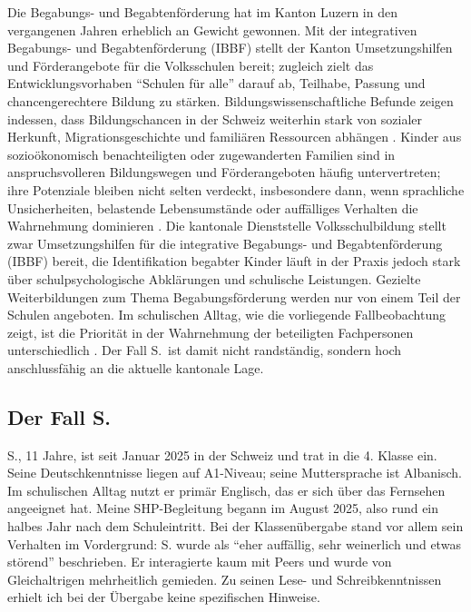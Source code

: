 \documentclass[ngerman, a4paper]{article}
\begin{document}
Die Begabungs- und Begabtenförderung hat im Kanton Luzern in den vergangenen Jahren
erheblich an Gewicht gewonnen. Mit der integrativen Begabungs- und Begabtenförderung
(IBBF) stellt der Kanton Umsetzungshilfen und Förderangebote für die Volksschulen bereit;
zugleich zielt das Entwicklungsvorhaben \enquote{Schulen für alle} darauf ab, Teilhabe, Passung
und chancengerechtere Bildung zu stärken. Bildungswissenschaftliche Befunde zeigen
indessen, dass Bildungschancen in der Schweiz weiterhin stark von sozialer Herkunft,
Migrationsgeschichte und familiären Ressourcen abhängen
\parencites[S.\,45--48]{erzinger2023pisa}[S.\,576--585]{stamm2021fehlenderblick}[S.\,34,\,37]{bfs2022migration}[S.\,317--319]{grossenbacher2014integrative}.
Kinder aus sozioökonomisch benachteiligten oder zugewanderten Familien sind in
anspruchsvolleren Bildungswegen und Förderangeboten häufig untervertreten; ihre Potenziale
bleiben nicht selten verdeckt, insbesondere dann, wenn sprachliche Unsicherheiten, belastende
Lebensumstände oder auffälliges Verhalten die Wahrnehmung dominieren
\parencites[S.\,76--78]{kellerkoller2025hellekoepfe}[S.\,6--8]{leikhof2021jugendliche}.
Die kantonale Dienststelle Volksschulbildung stellt zwar Umsetzungshilfen für die
integrative Begabungs- und Begabtenförderung (IBBF) bereit, die Identifikation
begabter Kinder läuft in der Praxis jedoch stark über schulpsychologische
Abklärungen und schulische Leistungen. Gezielte Weiterbildungen zum Thema
Begabungsförderung werden nur von einem Teil der Schulen angeboten. Im
schulischen Alltag, wie die vorliegende Fallbeobachtung zeigt, ist die
Priorität in der Wahrnehmung der beteiligten Fachpersonen unterschiedlich
\parencite{dvs2025bbf}. Der Fall S.\ ist damit nicht randständig, sondern
hoch anschlussfähig an die aktuelle kantonale Lage.

\subsection*{Der Fall S.}

S., 11 Jahre, ist seit Januar 2025 in der Schweiz und trat in die 4. Klasse ein.
Seine Deutschkenntnisse liegen auf A1-Niveau; seine Muttersprache ist Albanisch.
Im schulischen Alltag nutzt er primär Englisch, das er sich über das Fernsehen
angeeignet hat. Meine SHP-Begleitung begann im August 2025, also rund ein halbes
Jahr nach dem Schuleintritt. Bei der Klassenübergabe stand vor allem sein Verhalten
im Vordergrund: S. wurde als \enquote{eher auffällig, sehr weinerlich und etwas
  störend} beschrieben. Er interagierte kaum mit Peers und wurde von Gleichaltrigen
mehrheitlich gemieden. Zu seinen Lese- und Schreibkenntnissen erhielt ich bei der
Übergabe keine spezifischen Hinweise.
\end{document}
